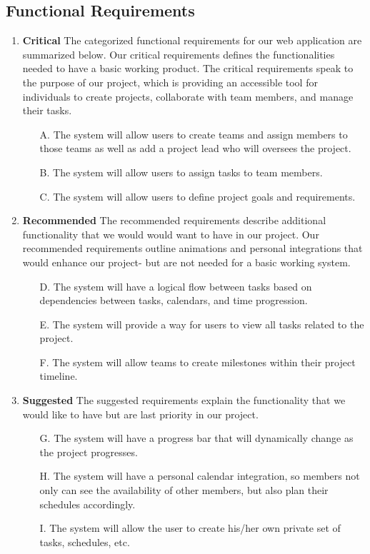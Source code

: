\subsection{Functional Requirements}
\begin{enumerate}
\item \textbf{Critical}
The categorized functional requirements for our web application are summarized below. Our critical requirements defines the functionalities needed to have a basic working product. The critical requirements speak to the purpose of our project, which is providing an accessible tool for individuals to create projects, collaborate with team members, and manage their tasks.
	\begin{enumerate}
	\item[A.] The system will allow users to create teams and assign members to those teams as well as add a project lead who will oversees the project. 
	\item[B.] The system will allow users to assign tasks to team members.
	\item[C.] The system will allow users to define project goals and requirements.

	\end{enumerate}
\item \textbf{Recommended}
The recommended requirements describe additional functionality that we would would want to have in our project. Our recommended requirements outline animations and personal integrations that would enhance our project- but are not needed for a basic working system. 
	\begin{enumerate}
	\item[D.] The system will have a logical flow between tasks based on dependencies between tasks, calendars, and time progression. 
	\item[E.] The system will provide a way for users to view all tasks related to the project.
	\item[F.] The system will allow teams to create milestones within their project timeline.
	\end{enumerate}
\item \textbf{Suggested}
The suggested requirements explain the functionality that we would like to have but are last priority in our project. 
	\begin{enumerate}
	\item[G.] The system will have a progress bar that will dynamically change as the project progresses.
	\item[H.] The system will have a personal calendar integration, so members not only can see the availability of other members, but also plan their schedules accordingly.
	\item[I.] The system will allow the user to create his/her own private set of tasks, schedules, etc.
	\end{enumerate}
\end{enumerate}
